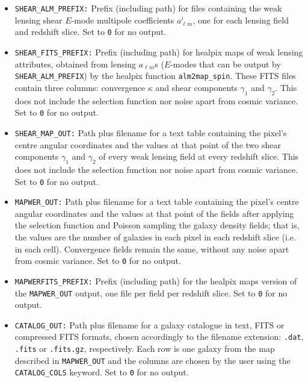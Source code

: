 \documentclass[12pt]{book} %
\begin{document}
\begin{itemize}
\item {\tt SHEAR\_ALM\_PREFIX:} Prefix (including path) for files containing the weak lensing 
  shear $E$-mode multipole coefficients $a^{i}_{\ell m}$, one for each lensing field and redshift 
  slice. Set to {\tt 0} for no output. 

\item {\tt SHEAR\_FITS\_PREFIX:} Prefix (including path) for {\sc healpix} maps 
  of weak lensing attributes, obtained from lensing $a_{\ell m}$s ($E$-modes that can be 
  output by {\tt SHEAR\_ALM\_PREFIX}) by the {\sc healpix} function {\tt alm2map\_spin}. 
  These FITS files contain three columns: convergence $\kappa$ and shear components 
  $\gamma_1$ and $\gamma_2$. This does not include the selection function nor noise apart 
  from cosmic variance. Set to {\tt 0} for no output. 

\item {\tt SHEAR\_MAP\_OUT:} Path plus filename for a text table containing the pixel's 
  centre angular coordinates and the values at that point of the two shear components  
  $\gamma_1$ and $\gamma_2$ of every weak lensing field at every redshift slice. 
  This does not include the selection function nor noise apart from cosmic variance. 
  Set to {\tt 0} for no output. 

\item {\tt MAPWER\_OUT:} Path plus filename for a text table containing the pixel's 
  centre angular coordinates and the values at that point of the fields after applying 
  the selection function and Poisson sampling the galaxy density fields; that is, the 
  values are the number of galaxies in each pixel in each redshift slice (i.e. in each 
  cell). Convergence fields remain the same, without any noise apart from 
  cosmic variance. Set to {\tt 0} for no output. 

\item {\tt MAPWERFITS\_PREFIX:} Prefix (including path) for the {\sc healpix} maps version 
  of the {\tt MAPWER\_OUT} output, one file per field per redshift slice. Set to {\tt 0} for no output. 

\item {\tt CATALOG\_OUT:} Path plus filename for a galaxy catalogue in text, FITS or compressed
  FITS formats, chosen accordingly to the filename extension: {\tt .dat}, {\tt .fits} or {\tt .fits.gz}, 
  respectively. Each row is one galaxy from the map described in {\tt MAPWER\_OUT} and 
  the columns are chosen by the user using the {\tt CATALOG\_COLS} keyword. Set to {\tt 0} for no output.


\end{itemize}
\end{document}
